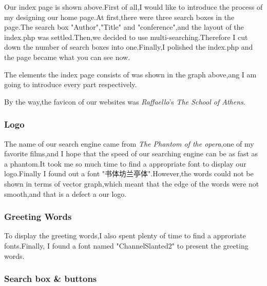 \documentclass[10pt,twoside,a4paper,titlepage]{article}
\begin{document}
	Our index page is shown above.First of all,I would like to introduce the process of my designing our home page.At first,there were three search boxes in the page.The search box "Author","Title" and "conference",and the layout of the index.php was settled.Then,we decided to use multi-searching.Therefore I cut down the number of search boxes into one.Finally,I polished the index.php and the page became what you can see now.
	
	The elements the index page consists of was shown in the graph above,ang I am going to introduce every part respectively.
	
	By the way,the favicon of our websites was \emph{Raffaello}'s \emph{The School of Athens}.
	
	\subsubsection{Logo}
	
	The name of our search engine came from \emph{The Phantom of the opera},one of my favorite films,and I hope that the speed of our searching engine can be as fast as a phantom.It took me so much time to find a appropriate font to display our logo.Finally I found out a font "书体坊兰亭体".However,the words could not be shown in terms of vector graph,which meant that the edge of the words were not smooth,and that is a defect a our logo.
	
	\subsubsection{Greeting Words}
	
	To display the greeting words,I also spent plenty of time to find a approriate fonts.Finally, I found a font named "ChannelSlanted2" to present the greeting words.
	
	\subsubsection{Search box \& buttons}
	
\end{document}
